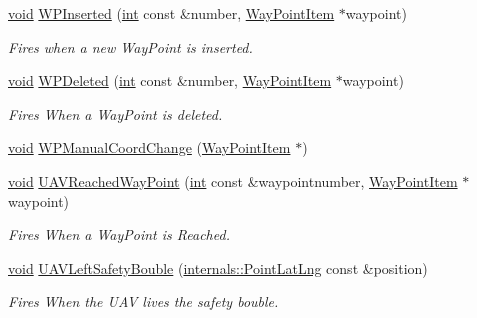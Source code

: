 \begin{DoxyCompactItemize}
\item 
\hyperlink{group___u_a_v_objects_plugin_ga444cf2ff3f0ecbe028adce838d373f5c}{void} \hyperlink{group___o_p_map_widget_gaacb4d7f71ed1c2874106d276563e1348}{W\-P\-Inserted} (\hyperlink{ioapi_8h_a787fa3cf048117ba7123753c1e74fcd6}{int} const \&number, \hyperlink{classmapcontrol_1_1_way_point_item}{Way\-Point\-Item} $\ast$waypoint)
\begin{DoxyCompactList}\small\item\em Fires when a new Way\-Point is inserted. \end{DoxyCompactList}\item 
\hyperlink{group___u_a_v_objects_plugin_ga444cf2ff3f0ecbe028adce838d373f5c}{void} \hyperlink{group___o_p_map_widget_ga27de44a330cf3ee63827db0c562f7bb8}{W\-P\-Deleted} (\hyperlink{ioapi_8h_a787fa3cf048117ba7123753c1e74fcd6}{int} const \&number, \hyperlink{classmapcontrol_1_1_way_point_item}{Way\-Point\-Item} $\ast$waypoint)
\begin{DoxyCompactList}\small\item\em Fires When a Way\-Point is deleted. \end{DoxyCompactList}\item 
\hyperlink{group___u_a_v_objects_plugin_ga444cf2ff3f0ecbe028adce838d373f5c}{void} \hyperlink{group___o_p_map_widget_gac6d662e318e008a70747a8d26b971a3a}{W\-P\-Manual\-Coord\-Change} (\hyperlink{classmapcontrol_1_1_way_point_item}{Way\-Point\-Item} $\ast$)
\item 
\hyperlink{group___u_a_v_objects_plugin_ga444cf2ff3f0ecbe028adce838d373f5c}{void} \hyperlink{group___o_p_map_widget_ga532ae30a356e865120c460f345a4ab65}{U\-A\-V\-Reached\-Way\-Point} (\hyperlink{ioapi_8h_a787fa3cf048117ba7123753c1e74fcd6}{int} const \&waypointnumber, \hyperlink{classmapcontrol_1_1_way_point_item}{Way\-Point\-Item} $\ast$waypoint)
\begin{DoxyCompactList}\small\item\em Fires When a Way\-Point is Reached. \end{DoxyCompactList}\item 
\hyperlink{group___u_a_v_objects_plugin_ga444cf2ff3f0ecbe028adce838d373f5c}{void} \hyperlink{group___o_p_map_widget_ga77cc2b980ecb442b256f8f494a8835c7}{U\-A\-V\-Left\-Safety\-Bouble} (\hyperlink{structinternals_1_1_point_lat_lng}{internals\-::\-Point\-Lat\-Lng} const \&position)
\begin{DoxyCompactList}\small\item\em Fires When the U\-A\-V lives the safety bouble. \end{DoxyCompactList}\item 

\end{DoxyCompactItemize}
